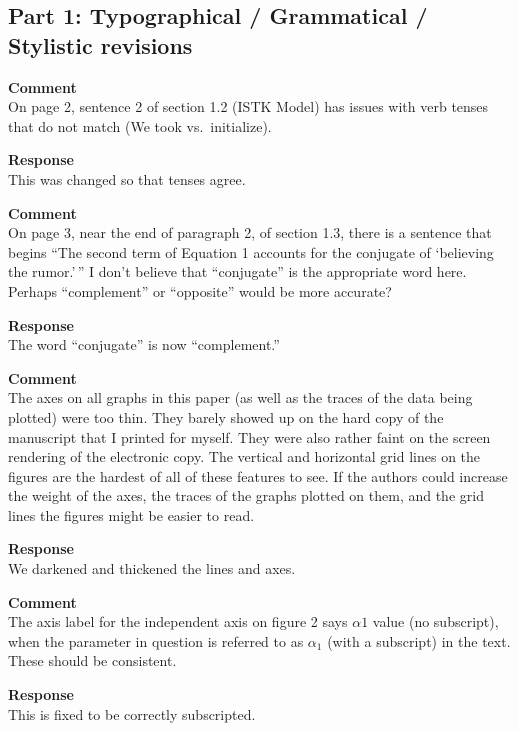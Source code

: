 \subsection{Part 1: Typographical / Grammatical / Stylistic revisions}
\setcounter{rev1-part1}{1}

\textbf{Comment } \\
On page 2, sentence 2 of section 1.2 (ISTK Model) has issues with verb tenses that do not match (We took vs.\ initialize).

\textbf{Response } \\
This was changed so that tenses agree.

\textbf{Comment } \\
On page 3, near the end of paragraph 2, of section 1.3, there is a sentence that begins ``The second term of Equation 1 accounts for the conjugate of `believing the rumor.'\,'' I don't believe that ``conjugate'' is the appropriate word here. Perhaps ``complement'' or ``opposite'' would be more accurate?

\textbf{Response } \\
The word ``conjugate'' is now ``complement.''

\textbf{Comment } \\
The axes on all graphs in this paper (as well as the traces of the data being plotted) were too thin.
They barely showed up on the hard copy of the manuscript that I printed for myself.
They were also rather faint on the screen rendering of the electronic copy.
The vertical and horizontal grid lines on the figures are the hardest of all of these features to see.
If the authors could increase the weight of the axes, the traces of the graphs plotted on them, and the grid lines the figures might be easier to read.

\textbf{Response } \\
We darkened and thickened the lines and axes.

\textbf{Comment } \\
The axis label for the independent axis on figure 2 says $ \alpha 1 $ value (no subscript), when the parameter in question is referred to as $ \alpha_1 $ (with a subscript) in the text.
These should be consistent.

\textbf{Response } \\
This is fixed to be correctly subscripted.
